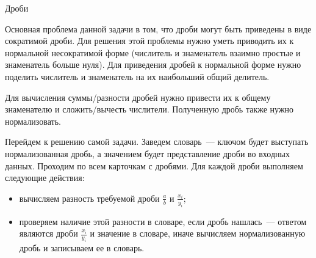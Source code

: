 \begin{tutorial}{Дроби}

Основная проблема данной задачи в том, что дроби могут быть приведены в виде сократимой дроби. Для решения этой проблемы нужно уметь приводить их к нормальной несократимой форме (числитель и знаменатель взаимно простые и знаменатель больше нуля). Для приведения дробей к нормальной форме нужно поделить числитель и знаменатель на их наибольший общий делитель.

Для вычисления суммы/разности дробей нужно привести их к общему знаменателю и сложить/вычесть числители. Полученную дробь также нужно нормализовать.

Перейдем к решению самой задачи. Заведем словарь~--- ключом будет выступать нормализованная дробь, а значением будет представление дроби во входных данных. Проходим по всем карточкам с дробями. Для каждой дроби выполняем следующие действия:
\begin {itemize}
\item вычисляем разность требуемой дроби $\frac{a}{b}$ и $\frac{x_i}{y_i}$;
\item проверяем наличие этой разности в словаре, если дробь нашлась~--- ответом являются дроби $\frac{x_i}{y_i}$ и значение в словаре, иначе вычисляем нормализованную дробь и записываем ее в словарь.
\end{itemize}

\end{tutorial}
